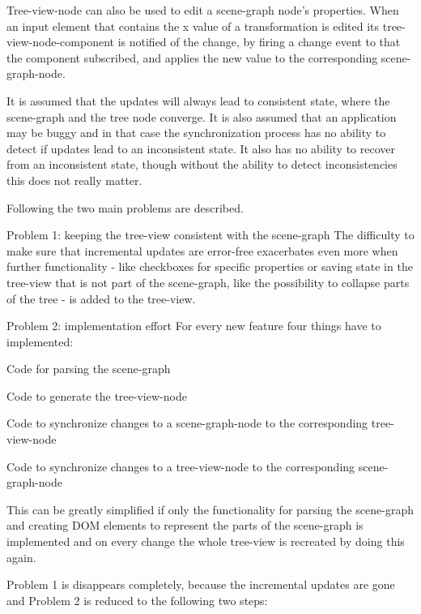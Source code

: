 Tree-view-node can also be used to edit a scene-graph node's properties. When an
input element that contains the x value of a transformation is edited its
tree-view-node-component is notified of the change, by firing a change event to
that the component subscribed, and applies the new value to the corresponding
scene-graph-node.

It is assumed that the updates will always lead to consistent state, where the
scene-graph and the tree node converge. It is also assumed that an application
may be buggy and in that case the synchronization process has no ability to
detect if updates lead to an inconsistent state. It also has no ability to
recover from an inconsistent state, though without the ability to detect
inconsistencies this does not really matter.

Following the two main problems are described.

\clearpage

\begin{description*}
  \item[Problem 1: keeping the tree-view consistent with the scene-graph]
    The difficulty to make sure that incremental updates are error-free
    exacerbates even more when further functionality - like checkboxes for
    specific properties or saving state in the tree-view that is not part of
    the scene-graph, like the possibility to collapse parts of the tree - is
    added to the tree-view.
  \item[Problem 2: implementation effort]
    For every new feature four things have to implemented:
    \begin{enumerate*}
      \item Code for parsing the scene-graph
      \item Code to generate the tree-view-node
      \item Code to synchronize changes to a scene-graph-node to the corresponding tree-view-node
      \item Code to synchronize changes to a tree-view-node to the corresponding scene-graph-node
    \end{enumerate*}
\end{description*}

This can be greatly simplified if only the functionality for parsing the
scene-graph and creating DOM elements to represent the parts of the scene-graph
is implemented and on every change the whole tree-view is recreated by doing
this again.

Problem 1 is disappears completely, because the incremental updates are gone and
Problem 2 is reduced to the following two steps:

